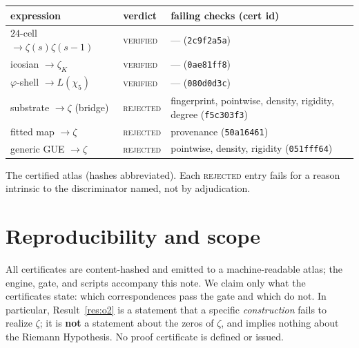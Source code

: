 \documentclass[11pt]{article}
\theoremstyle{definition}
\newcommand{\zetaK}{\zeta_{K}}
\begin{document}
\begin{center}\small
\begin{tabular}{llp{4.6cm}}
\hline
expression & verdict & failing checks (cert id)\\
\hline
$24$-cell $\to \zeta(s)\zeta(s-1)$ & \textsc{verified} & --- \quad(\texttt{2c9f2a5a})\\
icosian $\to \zetaK$ & \textsc{verified} & --- \quad(\texttt{0ae81ff8})\\
$\varphi$-shell $\to L(\chi_5)$ & \textsc{verified} & --- \quad(\texttt{080d0d3c})\\
substrate $\to \zeta$ (bridge) & \textsc{rejected} & fingerprint, pointwise, density, rigidity, degree \quad(\texttt{f5c303f3})\\
fitted map $\to \zeta$ & \textsc{rejected} & provenance \quad(\texttt{50a16461})\\
generic GUE $\to \zeta$ & \textsc{rejected} & pointwise, density, rigidity \quad(\texttt{051fff64})\\
\hline
\end{tabular}
\end{center}
\noindent The certified atlas (hashes abbreviated). Each \textsc{rejected} entry
fails for a reason intrinsic to the discriminator named, not by adjudication.

\section{Reproducibility and scope}
All certificates are content-hashed and emitted to a machine-readable atlas; the
engine, gate, and scripts accompany this note. We claim only what the certificates
state: which correspondences pass the gate and which do not. In particular,
Result~\ref{res:o2} is a statement that a specific \emph{construction} fails to
realize $\zeta$; it is \textbf{not} a statement about the zeros of $\zeta$, and
implies nothing about the Riemann Hypothesis. No proof certificate is defined or
issued.
\end{document}

